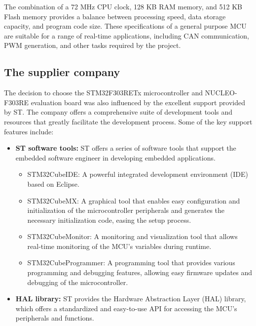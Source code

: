 The combination of a 72 MHz CPU clock, 128 KB RAM memory, and 512 KB Flash memory provides a balance between processing speed, data storage capacity, and program code size. These specifications of a general purpose MCU are suitable for a range of real-time applications, including CAN communication, PWM generation, and other tasks required by the project.

\subsection{The supplier company}

The decision to choose the STM32F303RETx microcontroller and NUCLEO-F303RE evaluation board was also influenced by the excellent support provided by ST. The company offers a comprehensive suite of development tools and resources that greatly facilitate the development process. Some of the key support features include:
\begin{itemize}
    \item \textbf{ST software tools: }ST offers a series of software tools that support the embedded software engineer in developing embedded applications.
    
    \begin{itemize}
    \item STM32CubeIDE: A powerful integrated development environment (IDE) based on Eclipse. \cite{R15}

    \item STM32CubeMX: A graphical tool that enables easy configuration and initialization of the microcontroller peripherals and generates the necessary initialization code, easing the setup process. \cite{R16}

    \item STM32CubeMonitor: A monitoring and visualization tool that allows real-time monitoring of the MCU's variables during runtime. \cite{R17}

    \item STM32CubeProgrammer: A programming tool that provides various programming and debugging features, allowing easy firmware updates and debugging of the microcontroller.\cite{R18}
    \end{itemize}

    \item \textbf{HAL library: }ST provides the Hardware Abstraction Layer (HAL) library, which offers a standardized and easy-to-use API for accessing the MCU's peripherals and functions.
\end{itemize}

